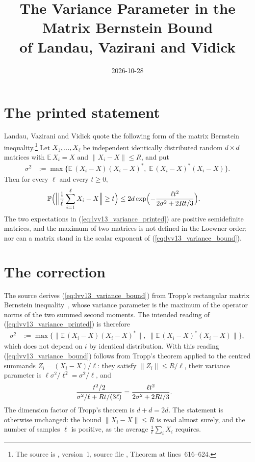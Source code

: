 \documentclass{article}
\title{The Variance Parameter in the Matrix Bernstein Bound\\
    of Landau, Vazirani and Vidick}
\author{}
\date{2026-10-28}
\begin{document}
\maketitle
{}

\section{The printed statement}

Landau, Vazirani and Vidick quote the following form of the matrix Bernstein
inequality.\footnote{The source is \cite{Landau2013PolynomialTime}, version~1,
    source file , Theorem  at lines~616--624.}
Let $X_1,\dots,X_\ell$ be independent identically distributed random
$d\times d$ matrices with $\mathbb E\,X_i=X$ and $\|X_i-X\|\le R$, and put
\begin{align}
    \sigma^2 & :=\max\bigl\{\mathbb E\,(X_i-X)(X_i-X)^{*},\;
    \mathbb E\,(X_i-X)^{*}(X_i-X)\bigr\}.
    \label{eq:lvv13_variance_printed}
\end{align}
Then for every $\ell$ and every $t\ge0$,
\begin{align}
    \mathbb P\Bigl(\Bigl\|\frac1\ell\sum_{i=1}^\ell X_i-X\Bigr\|\ge t\Bigr)
     & \le2d\exp\Bigl(-\frac{\ell t^2}{2\sigma^2+2Rt/3}\Bigr).
    \label{eq:lvv13_variance_bound}
\end{align}
The two expectations in (\ref{eq:lvv13_variance_printed}) are positive
semidefinite matrices, and the maximum of two matrices is not defined in the
Loewner order; nor can a matrix stand in the scalar exponent of
(\ref{eq:lvv13_variance_bound}).

\section{The correction}

The source derives (\ref{eq:lvv13_variance_bound}) from Tropp's rectangular
matrix Bernstein inequality~\cite[Theorem~1.6]{Tropp2012User}, whose variance
parameter is the maximum of the operator norms of the two summed second moments.
The intended reading of (\ref{eq:lvv13_variance_printed}) is therefore
\begin{align}
    \sigma^2 & :=\max\bigl\{\bigl\|\mathbb E\,(X_i-X)(X_i-X)^{*}\bigr\|,\;
    \bigl\|\mathbb E\,(X_i-X)^{*}(X_i-X)\bigr\|\bigr\},
    \label{eq:lvv13_variance_corrected}
\end{align}
which does not depend on $i$ by identical distribution. With this reading
(\ref{eq:lvv13_variance_bound}) follows from Tropp's theorem applied to the
centred summands $Z_i=(X_i-X)/\ell$: they satisfy $\|Z_i\|\le R/\ell$, their
variance parameter is $\ell\sigma^2/\ell^2=\sigma^2/\ell$, and
\begin{align}
    \frac{t^2/2}{\sigma^2/\ell+Rt/(3\ell)} & =\frac{\ell t^2}{2\sigma^2+2Rt/3}.
    \notag
\end{align}
The dimension factor of Tropp's theorem is $d+d=2d$. The statement is otherwise
unchanged: the bound $\|X_i-X\|\le R$ is read almost surely, and the number of
samples $\ell$ is positive, as the average $\frac1\ell\sum_iX_i$ requires.
\end{document}
